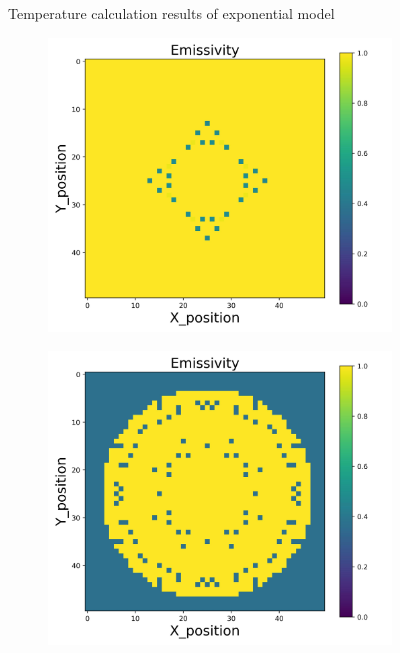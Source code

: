 {\begin{figure}[p]
\begin{minipage}{\textwidth}
\begin{subfigure}{0.325\textwidth}
        \end{subfigure}
    \end{minipage}
    \caption{Temperature calculation results of exponential model}  
\end{figure}
\begin{figure}[p]
    \centering
    \begin{minipage}{\textwidth}
        \centering
        \begin{subfigure}{0.325\textwidth}
            \centering
            \includegraphics[width=\textwidth]{figures/raw_data/0/exp/emi_cal.jpg}
        \end{subfigure}
        \begin{subfigure}{0.325\textwidth}
            \centering
            \includegraphics[width=\textwidth]{figures/raw_data/5/exp/emi_cal.jpg}

\end{subfigure}
\end{minipage}
\end{figure}}
